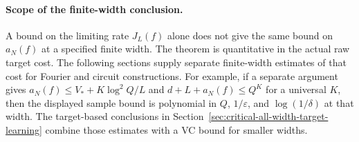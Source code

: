 \paragraph{Scope of the finite-width conclusion.}
A bound on the limiting rate $J_L(f)$ alone does not give the same bound
on $a_N(f)$ at a specified finite width. The theorem is quantitative in
the actual raw target cost. The following sections supply separate
finite-width estimates of that cost for Fourier and circuit constructions. For example, if a separate
argument gives $a_N(f)\le V_*+K\log^2 Q/L$ and $d+L+a_N(f)\le Q^K$
for a universal $K$, then the displayed sample bound is polynomial in
$Q$, $1/\varepsilon$, and $\log(1/\delta)$ at that width. The target-based conclusions in
Section~\ref{sec:critical-all-width-target-learning} combine those
estimates with a VC bound for smaller widths.

